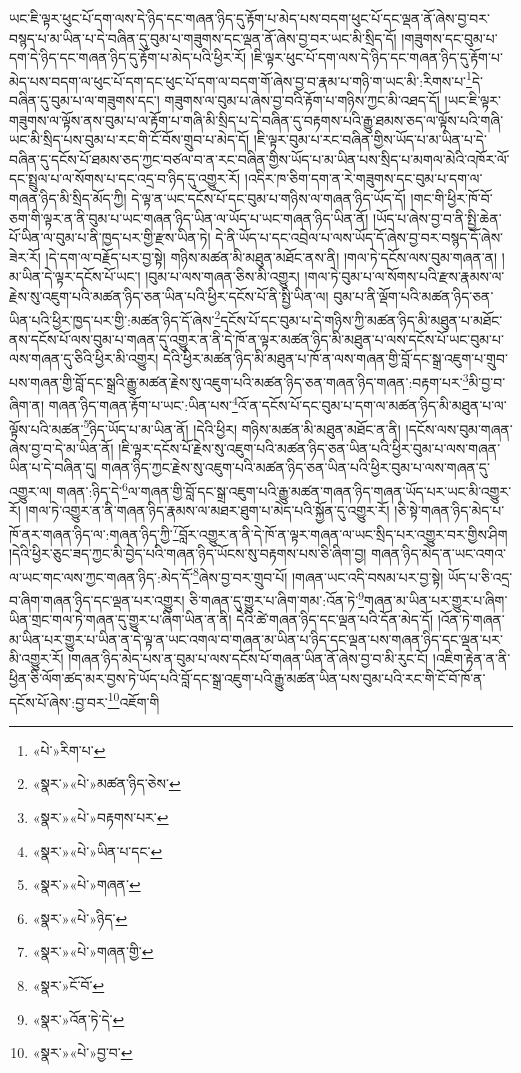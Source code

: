 ཡང་ཇི་ལྟར་ཕུང་པོ་དག་ལས་དེ་ཉིད་དང་གཞན་ཉིད་དུ་རྟོག་པ་མེད་པས་བདག་ཕུང་པོ་དང་ལྡན་ནོ་ཞེས་བྱ་བར་བསྙད་པ་མ་ཡིན་པ་དེ་བཞིན་དུ་བུམ་པ་གཟུགས་དང་ལྡན་ནོ་ཞེས་བྱ་བར་ཡང་མི་སྲིད་དོ། །གཟུགས་དང་བུམ་པ་དག་དེ་ཉིད་དང་གཞན་ཉིད་དུ་རྟོག་པ་མེད་པའི་ཕྱིར་རོ། །ཇི་ལྟར་ཕུང་པོ་དག་ལས་དེ་ཉིད་དང་གཞན་ཉིད་དུ་རྟོག་པ་མེད་པས་བདག་ལ་ཕུང་པོ་དག་དང་ཕུང་པོ་དག་ལ་བདག་གོ་ཞེས་བྱ་བ་རྣམ་པ་གཉི་ག་ཡང་མི་:རིགས་པ་\footnote{«པེ་»རིག་པ་}དེ་བཞིན་དུ་བུམ་པ་ལ་གཟུགས་དང་། གཟུགས་ལ་བུམ་པ་ཞེས་བྱ་བའི་རྟོག་པ་གཉིས་ཀྱང་མི་འཐད་དོ། །ཡང་ཇི་ལྟར་གཟུགས་ལ་ལྟོས་ནས་བུམ་པ་ལ་རྟོག་པ་གཞི་མི་སྲིད་པ་དེ་བཞིན་དུ་བརྟགས་པའི་རྒྱུ་ཐམས་ཅད་ལ་ལྟོས་པའི་གཞི་ཡང་མི་སྲིད་པས་བུམ་པ་རང་གི་ངོ་བོས་གྲུབ་པ་མེད་དོ། །ཇི་ལྟར་བུམ་པ་རང་བཞིན་གྱིས་ཡོད་པ་མ་ཡིན་པ་དེ་བཞིན་དུ་དངོས་པོ་ཐམས་ཅད་ཀྱང་བཙལ་བ་ན་རང་བཞིན་གྱིས་ཡོད་པ་མ་ཡིན་པས་སྲིད་པ་མགལ་མེའི་འཁོར་ལོ་དང་སྤྲུལ་པ་ལ་སོགས་པ་དང་འདྲ་བ་ཉིད་དུ་འགྱུར་རོ། །འདིར་ཁ་ཅིག་དག་ན་རེ་གཟུགས་དང་བུམ་པ་དག་ལ་གཞན་ཉིད་མི་སྲིད་མོད་ཀྱི། དེ་ལྟ་ན་ཡང་དངོས་པོ་དང་བུམ་པ་གཉིས་ལ་གཞན་ཉིད་ཡོད་དོ། །གང་གི་ཕྱིར་ཁོ་བོ་ཅག་གི་ལྟར་ན་ནི་བུམ་པ་ཡང་གཞན་ཉིད་ཡིན་ལ་ཡོད་པ་ཡང་གཞན་ཉིད་ཡིན་ནོ། །ཡོད་པ་ཞེས་བྱ་བ་ནི་སྤྱི་ཆེན་པོ་ཡིན་ལ་བུམ་པ་ནི་ཁྱད་པར་གྱི་རྫས་ཡིན་ཏེ། དེ་ནི་ཡོད་པ་དང་འབྲེལ་པ་ལས་ཡོད་དོ་ཞེས་བྱ་བར་བསྙད་དོ་ཞེས་ཟེར་རོ། །དེ་དག་ལ་བརྗོད་པར་བྱ་སྟེ། གཉིས་མཚན་མི་མཐུན་མཐོང་ནས་ནི། །གལ་ཏེ་དངོས་ལས་བུམ་གཞན་ན། །མ་ཡིན་དེ་ལྟར་དངོས་པོ་ཡང་། །བུམ་པ་ལས་གཞན་ཅིས་མི་འགྱུར། །གལ་ཏེ་བུམ་པ་ལ་སོགས་པའི་རྫས་རྣམས་ལ་རྗེས་སུ་འཇུག་པའི་མཚན་ཉིད་ཅན་ཡིན་པའི་ཕྱིར་དངོས་པོ་ནི་སྤྱི་ཡིན་ལ། བུམ་པ་ནི་ལྡོག་པའི་མཚན་ཉིད་ཅན་ཡིན་པའི་ཕྱིར་ཁྱད་པར་གྱི་:མཚན་ཉིད་དོ་ཞེས་\footnote{«སྣར་»«པེ་»མཚན་ཉིད་ཅེས་}དངོས་པོ་དང་བུམ་པ་དེ་གཉིས་ཀྱི་མཚན་ཉིད་མི་མཐུན་པ་མཐོང་ནས་དངོས་པོ་ལས་བུམ་པ་གཞན་དུ་འགྱུར་ན་ནི་དེ་ཁོ་ན་ལྟར་མཚན་ཉིད་མི་མཐུན་པ་ལས་དངོས་པོ་ཡང་བུམ་པ་ལས་གཞན་དུ་ཅིའི་ཕྱིར་མི་འགྱུར། དེའི་ཕྱིར་མཚན་ཉིད་མི་མཐུན་པ་ཁོ་ན་ལས་གཞན་གྱི་བློ་དང་སྒྲ་འཇུག་པ་གྲུབ་པས་གཞན་གྱི་བློ་དང་སྒྲའི་རྒྱུ་མཚན་རྗེས་སུ་འཇུག་པའི་མཚན་ཉིད་ཅན་གཞན་ཉིད་གཞན་:བརྟག་པར་\footnote{«སྣར་»«པེ་»བརྟགས་པར་}མི་བྱ་བ་ཞིག་ན། གཞན་ཉིད་གཞན་རྟོག་པ་ཡང་:ཡིན་པས་\footnote{«སྣར་»«པེ་»ཡིན་པ་དང་}འོ་ན་དངོས་པོ་དང་བུམ་པ་དག་ལ་མཚན་ཉིད་མི་མཐུན་པ་ལ་ལྟོས་པའི་མཚན་\footnote{«སྣར་»«པེ་»གཞན་}ཉིད་ཡོད་པ་མ་ཡིན་ནོ། །དེའི་ཕྱིར། གཉིས་མཚན་མི་མཐུན་མཐོང་ན་ནི། །དངོས་ལས་བུམ་གཞན་ཞེས་བྱ་བ་དེ་མ་ཡིན་ནོ། །ཇི་ལྟར་དངོས་པོ་རྗེས་སུ་འཇུག་པའི་མཚན་ཉིད་ཅན་ཡིན་པའི་ཕྱིར་བུམ་པ་ལས་གཞན་ཡིན་པ་དེ་བཞིན་དུ། གཞན་ཉིད་ཀྱང་རྗེས་སུ་འཇུག་པའི་མཚན་ཉིད་ཅན་ཡིན་པའི་ཕྱིར་བུམ་པ་ལས་གཞན་དུ་འགྱུར་ལ། གཞན་:ཉིད་དེ་\footnote{«སྣར་»«པེ་»ཉིད་}ལ་གཞན་གྱི་བློ་དང་སྒྲ་འཇུག་པའི་རྒྱུ་མཚན་གཞན་ཉིད་གཞན་ཡོད་པར་ཡང་མི་འགྱུར་རོ། །གལ་ཏེ་འགྱུར་ན་ནི་གཞན་ཉིད་རྣམས་ལ་མཐར་ཐུག་པ་མེད་པའི་སྐྱོན་དུ་འགྱུར་རོ། །ཅི་སྟེ་གཞན་ཉིད་མེད་པ་ཁོ་ནར་གཞན་ཉིད་ལ་:གཞན་ཉིད་ཀྱི་\footnote{«སྣར་»«པེ་»གཞན་གྱི་}བློར་འགྱུར་ན་ནི་དེ་ཁོ་ན་ལྟར་གཞན་ལ་ཡང་སྲིད་པར་འགྱུར་བར་གྱིས་ཤིག །དེའི་ཕྱིར་ཅུང་ཟད་ཀྱང་མི་བྱེད་པའི་གཞན་ཉིད་ཡོངས་སུ་བརྟགས་པས་ཅི་ཞིག་བྱ། གཞན་ཉིད་མེད་ན་ཡང་འགའ་ལ་ཡང་གང་ལས་ཀྱང་གཞན་ཉིད་:མེད་དོ་\footnote{«སྣར་»ངོ་བོ་}ཞེས་བྱ་བར་གྲུབ་པོ། །གཞན་ཡང་འདི་བསམ་པར་བྱ་སྟེ། ཡོད་པ་ཅི་འདྲ་བ་ཞིག་གཞན་ཉིད་དང་ལྡན་པར་འགྱུར། ཅི་གཞན་དུ་གྱུར་པ་ཞིག་གམ་:འོན་ཏེ་\footnote{«སྣར་»འོན་ཏེ་དེ་}གཞན་མ་ཡིན་པར་གྱུར་པ་ཞིག་ཡིན་གྲང་གལ་ཏེ་གཞན་དུ་གྱུར་པ་ཞིག་ཡིན་ན་ནི། དེའི་ཚེ་གཞན་ཉིད་དང་ལྡན་པའི་དོན་མེད་དོ། །འོན་ཏེ་གཞན་མ་ཡིན་པར་གྱུར་པ་ཡིན་ན་དེ་ལྟ་ན་ཡང་འགལ་བ་གཞན་མ་ཡིན་པ་ཉིད་དང་ལྡན་པས་གཞན་ཉིད་དང་ལྡན་པར་མི་འགྱུར་རོ། །གཞན་ཉིད་མེད་པས་ན་བུམ་པ་ལས་དངོས་པོ་གཞན་ཡིན་ནོ་ཞེས་བྱ་བ་མི་རུང་ངོ། །འཇིག་རྟེན་ན་ནི་ཕྱིན་ཅི་ལོག་ཚད་མར་བྱས་ཏེ་ཡོད་པའི་བློ་དང་སྒྲ་འཇུག་པའི་རྒྱུ་མཚན་ཡིན་པས་བུམ་པའི་རང་གི་ངོ་བོ་ཁོ་ན་དངོས་པོ་ཞེས་:བྱ་བར་\footnote{«སྣར་»«པེ་»བྱ་བ་}འཇོག་གི 